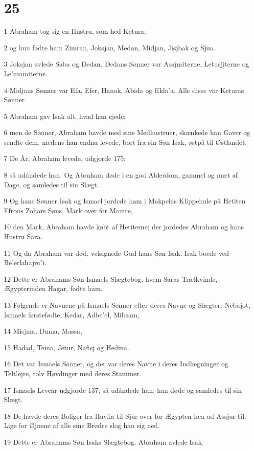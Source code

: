 \chapter{25}

\par 1 Abraham tog sig en Hustru, som hed Ketura;
\par 2 og hun fødte ham Zimran, Joksjan, Medan, Midjan, Jisjbak og Sjua.
\par 3 Joksjan avlede Saba og Dedan. Dedans Sønner var Assjuriterne, Letusjiterne og Le'ummiterne.
\par 4 Midjans Sønner var Efa, Efer, Hanok, Abida og Elda'a. Alle disse var Keturas Sønner.
\par 5 Abraham gav Isak alt, hvad han ejede;
\par 6 men de Sønner, Abraham havde med sine Medhustruer, skænkede han Gaver og sendte dem, medens han endnu levede, bort fra sin Søn Isak, østpå til Østlandet.
\par 7 De År, Abraham levede, udgjorde 175;
\par 8 så udåndede han. Og Abraham døde i en god Alderdom, gammel og mæt af Dage, og samledes til sin Slægt.
\par 9 Og hans Sønner Isak og Ismael jordede ham i Makpelas Klippehule på Hetiten Efrons Zohars Søns, Mark over for Mamre,
\par 10 den Mark, Abraham havde købt af Hetiterne; der jordedes Abraham og hans Hustru Sara.
\par 11 Og da Abraham var død, velsignede Gud hans Søn Isak. Isak boede ved Be'erlahajro'i.
\par 12 Dette er Abrahams Søn Ismaels Slægtebog, hvem Saras Trælkvinde, Ægypterinden Hagar, fødte ham.
\par 13 Følgende er Navnene på Ismaels Sønner efter deres Navne og Slægter: Nebajot, Ismaels førstefødte, Kedar, Adbe'el, Mibsam,
\par 14 Misjma, Duma, Massa,
\par 15 Hadad, Tema, Jetur, Nafisj og Hedma.
\par 16 Det var Ismaels Sønner, og det var deres Navne i deres Indhegninger og Teltlejre, tolv Høvdinger med deres Stammer.
\par 17 Ismaels Leveår udgjorde 137; så udåndede han; han døde og samledes til sin Slægt.
\par 18 De havde deres Boliger fra Havila til Sjur over for Ægypten hen ad Assjur til. Lige for Øjnene af alle sine Brødre slog han sig ned.
\par 19 Dette er Abrahams Søn Isaks Slægtebog. Abraham avlede Isak.
